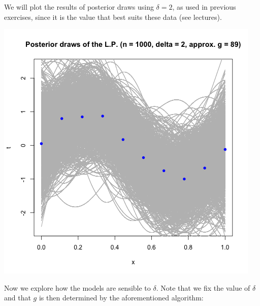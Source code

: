 \documentclass[a4paper, 11pt]{article}
\begin{document}
We will plot the results of posterior draws using $\delta=2$, as used in previous exercises, since it is the value that best suits these data (see lectures).
\begin{center}
\includegraphics[scale=0.6]{ps3F_plot2.png}
\end{center}
Now we explore how the models are sensible to $\delta$. Note that we fix the value of $\delta$ and that $g$ is then determined by the aforementioned algorithm:\\
\end{document}
